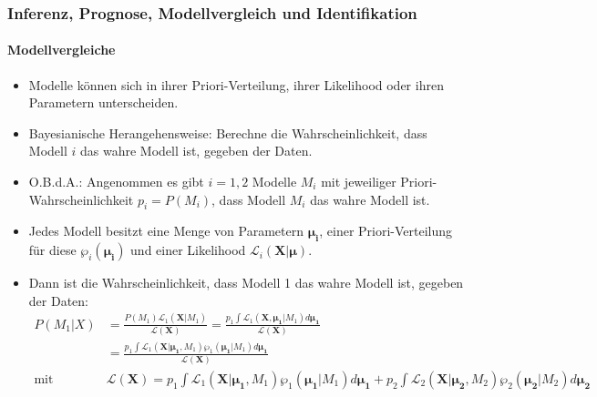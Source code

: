 \documentclass{beamer} %
\begin{document}
\begin{frame}\frametitle{Inferenz, Prognose, Modellvergleich und Identifikation}\framesubtitle{Modellvergleiche}
  \begin{itemize}
    \item Modelle können sich in ihrer Priori-Verteilung, ihrer Likelihood oder ihren Parametern unterscheiden.
    \item Bayesianische Herangehensweise: Berechne die Wahrscheinlichkeit, dass Modell $i$ das wahre Modell ist, gegeben der Daten.
    \item O.B.d.A.: Angenommen es gibt $i=1,2$ Modelle $M_i$ mit jeweiliger Priori-Wahrscheinlichkeit $p_i=P(M_i)$, dass Modell $M_i$ das wahre Modell ist.
    \item Jedes Modell besitzt eine Menge von Parametern $\boldsymbol{\mu_i}$, einer Priori-Verteilung für diese $\wp_i(\boldsymbol{\mu_i})$ und einer Likelihood $\mathcal{L}_i(\mathbf{X}|\boldsymbol{\mu})$.
    \item Dann ist die Wahrscheinlichkeit, dass Modell 1 das wahre Modell ist, gegeben der Daten:
    \scriptsize\begin{align*}
      P(M_1|X) &= \frac{P(M_1)\mathcal{L}_1(\mathbf{X}|M_1)}{\mathcal{L}(\mathbf{X})} = \frac{p_1 \int \mathcal{L}_1(\mathbf{X},\mathbf{\boldsymbol{\mu_1}}|M_1)d \boldsymbol{\mu_1}}{\mathcal{L}(\mathbf{X})}\\
      &= \frac{p_1 \int \mathcal{L}_1(\mathbf{X}|\boldsymbol{\mu_1},M_1) \wp_1(\boldsymbol{\mu_1}|M_1) d \boldsymbol{\mu_1}}{\mathcal{L}(\mathbf{X})}\\
      \text{mit }& \mathcal{L}(\mathbf{X}) = p_1 \int \mathcal{L}_1(\mathbf{X}|\boldsymbol{\mu_1},M_1)\wp_1(\boldsymbol{\mu_1}|M_1)d\boldsymbol{\mu_1} + p_2 \int \mathcal{L}_2(\mathbf{X}|\boldsymbol{\mu_2},M_2)\wp_2(\boldsymbol{\mu_2}|M_2)d\boldsymbol{\mu_2}
    \end{align*}
  \end{itemize}
\end{frame}
\end{document}
